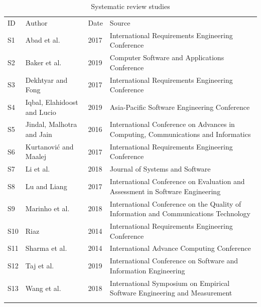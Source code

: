 \documentclass[conference]{IEEEtran}
\begin{document}
\begin{table}[!htbp]
\caption{Systematic review studies}
\label{tab:studies}       %
\begin{tabular}{p{0.1cm}p{2cm}p{0.4cm}p{4.4cm}}
\hline\noalign{\smallskip}
ID & Author & Date & Source \\
\noalign{\smallskip}\hline\noalign{\smallskip}
S1 & Abad et al. \cite{8049172} & 2017 & International Requirements Engineering Conference \\
S2 & Baker et al. \cite{8754214} & 2019 & Computer Software and Applications Conference \\
S3 & Dekhtyar and Fong \cite{8049170} & 2017 & International Requirements Engineering Conference \\
S4 & Iqbal, Elahidoost and Lucio \cite{8719411} & 2019 & Asia-Pacific Software Engineering Conference \\
S5 & Jindal, Malhotra and Jain \cite{7732349} & 2016 & International Conference on Advances in Computing, Communications and Informatics \\
S6 & Kurtanović and Maalej \cite{8049171} & 2017 & International Requirements Engineering Conference \\
S7 & Li et al. \cite{LI2018108} & 2018 & Journal of Systems and Software \\
S8 & Lu and Liang \cite{Lu:2017:ACN:3084226.3084241} & 2017 & International Conference on Evaluation and Assessment in Software Engineering \\
S9 & Marinho et al. \cite{8590177} & 2018 & International Conference on the Quality of Information and Communications Technology \\
S10 & Riaz \cite{6912260} & 2014 & International Requirements Engineering Conference \\
S11 & Sharma et al. \cite{6779538} & 2014 & International Advance Computing Conference \\
S12 & Taj et al. \cite{Taj:2019:ADM:3328833.3328837} & 2019 & International Conference on Software and Information Engineering \\
S13 & Wang et al. \cite{Wang:2018:ACI:3239235.3267428} & 2018 & International Symposium on Empirical Software Engineering and Measurement \\
\noalign{\smallskip}\hline
\end{tabular}
\end{table}
\end{document}
